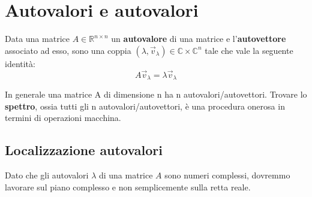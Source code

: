 \chapter{Autovalori e autovalori}
\begin{definizione} 
    Data una matrice $A \in \mathbb{R}^{n\times n}$ un \textbf{autovalore} di una
    matrice e l'\textbf{autovettore} associato ad esso, sono una coppia $(\lambda,
        \vec{v}_\lambda)\in \mathbb{C}\times\mathbb{C}^{n}$ tale che vale la
    seguente identità:
    \begin{equation*}
        A\vec{v}_\lambda = \lambda \vec{v}_\lambda
    \end{equation*}
\end{definizione}
In generale una matrice A di dimensione n ha n autovalori/autovettori. Trovare
lo \textbf{spettro}, ossia tutti gli n autovalori/autovettori, è una procedura
onerosa in termini di operazioni macchina.
\section{Localizzazione autovalori}
Dato che gli autovalori $\lambda$ di una matrice $A$ sono numeri complessi, dovremmo
lavorare sul piano complesso e non semplicemente sulla retta reale.

